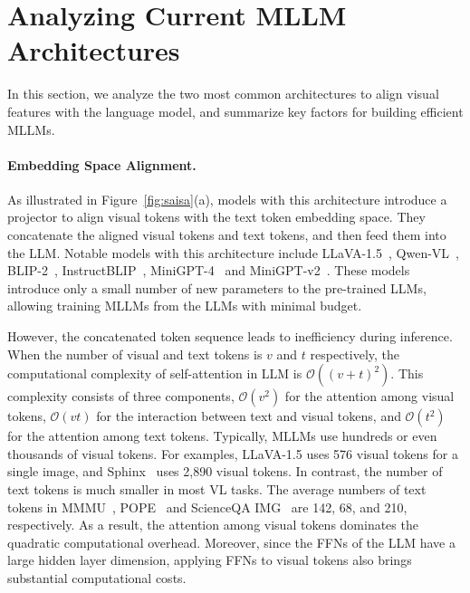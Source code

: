 \section{Analyzing Current MLLM Architectures}
\label{sec:architectures}
In this section, we analyze the two most common architectures to align visual features with the language model, and summarize key factors for building efficient MLLMs.

\vspace{-0.35cm}
\paragraph{Embedding Space Alignment.}
As illustrated in Figure~\ref{fig:saisa}(a), models with this architecture introduce a projector to align visual tokens with the text token embedding space.
They concatenate the aligned visual tokens and text tokens, and then feed them into the LLM.
Notable models with this architecture include  LLaVA-1.5~\cite{liu2024improvedbaselinesvisualinstruction}, Qwen-VL~\cite{Qwen-VL}, BLIP-2~\cite{li2023blip2bootstrappinglanguageimagepretraining}, InstructBLIP~\cite{dai2023instructblipgeneralpurposevisionlanguagemodels}, MiniGPT-4~\cite{zhu2023minigpt4enhancingvisionlanguageunderstanding} and MiniGPT-v2~\cite{chen2023minigptv2largelanguagemodel}.
These models introduce only a small number of new parameters to the pre-trained LLMs, allowing training MLLMs from the LLMs with minimal budget.

However, the concatenated token sequence leads to inefficiency during inference.
When the number of visual and text tokens is $v$ and $t$ respectively, the computational complexity of self-attention in LLM is $\mathcal{O}((v+t)^2)$.
This complexity consists of three components, $\mathcal{O}(v^2)$ for the attention among visual tokens, $\mathcal{O}(vt)$ for the interaction between text and visual tokens, and $\mathcal{O}(t^2)$ for the attention among text tokens.
Typically, MLLMs use hundreds or even thousands of visual tokens.
For examples, LLaVA-1.5 uses 576 visual tokens for a single image, and Sphinx~\cite{lin2023sphinxjointmixingweights} uses 2,890 visual tokens.
In contrast, the number of text tokens is much smaller in most VL tasks.
The average numbers of text tokens in MMMU~\cite{yue2024mmmumassivemultidisciplinemultimodal}, POPE~\cite{li2023evaluatingobjecthallucinationlarge} and ScienceQA IMG~\cite{lu2022learnexplainmultimodalreasoning} are 142, 68, and 210, respectively.
As a result, the attention among visual tokens dominates the quadratic computational overhead.
Moreover, since the FFNs of the LLM have a large hidden layer dimension, applying FFNs to visual tokens also brings substantial computational costs.



